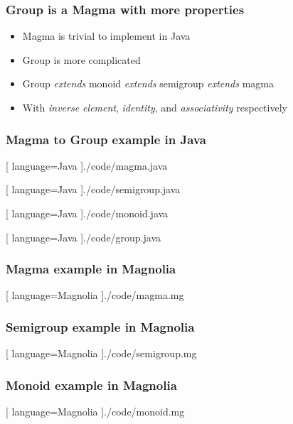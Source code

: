 \begin{frame}
  \frametitle{Group is a Magma with more properties}
  \begin{itemize}
    \item Magma is trivial to implement in Java
    \item Group is more complicated
    \item Group \textit{extends} monoid \textit{extends} semigroup
      \textit{extends} magma
    \item With \textit{inverse element}, \textit{identity}, and
      \textit{associativity} respectively
  \end{itemize}
\end{frame}

\begin{frame}
    \frametitle{Magma to Group example in Java}
    \begin{center}
      
      [ language=Java
      ]{./code/magma.java}
    \end{center}
    \begin{center}
      
      [ language=Java
      ]{./code/semigroup.java}
    \end{center}
    \begin{center}
      
      [ language=Java
      ]{./code/monoid.java}
    \end{center}
    \begin{center}
      
      [ language=Java
      ]{./code/group.java}
    \end{center}
\end{frame}

\begin{frame}
    \frametitle{Magma example in Magnolia}
    \begin{center}
      
      [ language=Magnolia
      ]{./code/magma.mg}
    \end{center}
\end{frame}

\begin{frame}
    \frametitle{Semigroup example in Magnolia}
    \begin{center}
      
      [ language=Magnolia
      ]{./code/semigroup.mg}
    \end{center}
\end{frame}

\begin{frame}
    \frametitle{Monoid example in Magnolia}
    \begin{center}
      
      [ language=Magnolia
      ]{./code/monoid.mg}
    \end{center}
\end{frame}

